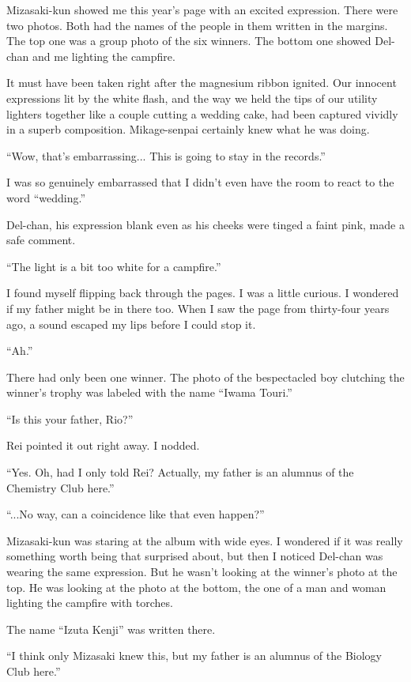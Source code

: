 \documentclass[
    a4paper,
    12pt,
    twoside,
    openany,
    UTF8,
    fontset=windows
]{ctexbook}
\begin{document}
Mizasaki-kun showed me this year's page with an excited expression. There were two photos. Both had the names of the people in them written in the margins. The top one was a group photo of the six winners. The bottom one showed Del-chan and me lighting the campfire.

It must have been taken right after the magnesium ribbon ignited. Our innocent expressions lit by the white flash, and the way we held the tips of our utility lighters together like a couple cutting a wedding cake, had been captured vividly in a superb composition. Mikage-senpai certainly knew what he was doing.

``Wow, that's embarrassing... This is going to stay in the records.''

I was so genuinely embarrassed that I didn't even have the room to react to the word ``wedding.''

Del-chan, his expression blank even as his cheeks were tinged a faint pink, made a safe comment.

``The light is a bit too white for a campfire.''

I found myself flipping back through the pages. I was a little curious. I wondered if my father might be in there too. When I saw the page from thirty-four years ago, a sound escaped my lips before I could stop it.

``Ah.''

There had only been one winner. The photo of the bespectacled boy clutching the winner's trophy was labeled with the name ``Iwama Touri.''

``Is this your father, Rio?''

Rei pointed it out right away. I nodded.

``Yes. Oh, had I only told Rei? Actually, my father is an alumnus of the Chemistry Club here.''

``...No way, can a coincidence like that even happen?''

Mizasaki-kun was staring at the album with wide eyes. I wondered if it was really something worth being that surprised about, but then I noticed Del-chan was wearing the same expression. But he wasn't looking at the winner's photo at the top. He was looking at the photo at the bottom, the one of a man and woman lighting the campfire with torches.

The name ``Izuta Kenji'' was written there.

``I think only Mizasaki knew this, but my father is an alumnus of the Biology Club here.''
\end{document}
